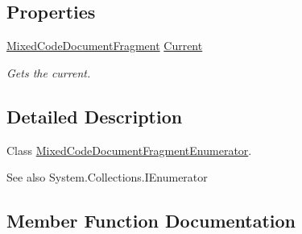 \subsection*{Properties}
\begin{DoxyCompactItemize}
\item 
\hyperlink{class_html_agility_pack_1_1_mixed_code_document_fragment}{Mixed\+Code\+Document\+Fragment} \hyperlink{class_html_agility_pack_1_1_mixed_code_document_fragment_list_1_1_mixed_code_document_fragment_enumerator_a9aeb4e563dfd102fce6e061a82bdd1aa}{Current}
\begin{DoxyCompactList}\small\item\em Gets the current. \end{DoxyCompactList}\end{DoxyCompactItemize}


\subsection{Detailed Description}
Class \hyperlink{class_html_agility_pack_1_1_mixed_code_document_fragment_list_1_1_mixed_code_document_fragment_enumerator}{Mixed\+Code\+Document\+Fragment\+Enumerator}. 

\begin{DoxySeeAlso}{See also}
System.\+Collections.\+I\+Enumerator


\end{DoxySeeAlso}


\subsection{Member Function Documentation}
\mbox{\label{class_html_agility_pack_1_1_mixed_code_document_fragment_list_1_1_mixed_code_document_fragment_enumerator_ad7ffaba8b471800e5f02bb057f2c9984}} 
